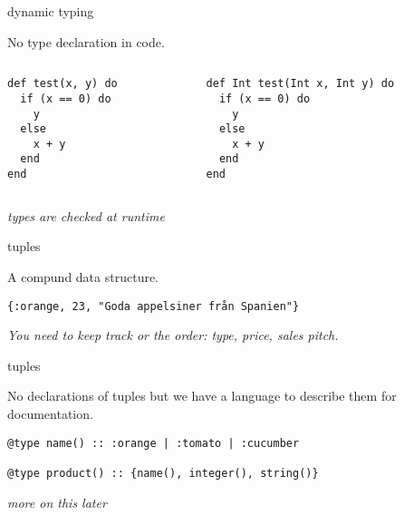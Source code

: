 \begin{frame}[fragile]{dynamic typing}

  No type declaration in code.

  \begin{columns}
   \begin{column}{0.5\textwidth}
    \begin{lstlisting}
def test(x, y) do
  if (x == 0) do
    y
  else 
    x + y
  end
end
     \end{lstlisting}
   \end{column}
   \begin{column}{0.5\textwidth}
    \begin{lstlisting}
def Int test(Int x, Int y) do
  if (x == 0) do
    y
  else 
    x + y
  end
end
     \end{lstlisting}
   \end{column}   
 \end{columns}


 \vspace{20pt}
{\em types are checked at runtime}
 
\end{frame}


\begin{frame}{tuples}

  A compund data structure. \pause

  \vspace{20pt}

  {\tt \{:orange, 23, "Goda appelsiner från Spanien"\}}  \pause

  \vspace{20pt}

  {\em You need to keep track or the order: type, price, sales pitch.}

\end{frame}

\begin{frame}[fragile]{tuples}

  No declarations of tuples but we have a language to describe them
  for documentation.\pause

  \vspace{20pt}  
  \begin{lstlisting}
@type name() :: :orange | :tomato | :cucumber

@type product() :: {name(), integer(), string()}
  \end{lstlisting}

  \pause
  \vspace{10pt}
  {\em more on this later}

\end{frame}

